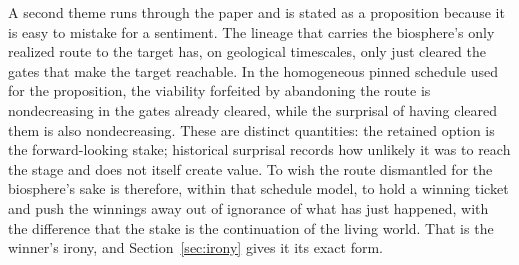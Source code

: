 A second theme runs through the paper and is stated as a proposition
because it is easy to mistake for a sentiment. The lineage that carries
the biosphere's only realized route to the target has, on geological
timescales, only just cleared the gates that make the target reachable.
In the homogeneous pinned schedule used for the proposition, the
viability forfeited by abandoning the route is nondecreasing in the
gates already cleared, while the surprisal of having cleared them is
also nondecreasing. These are distinct quantities: the retained option
is the forward-looking stake; historical surprisal records how unlikely
it was to reach the stage and does not itself create value. To wish the
route dismantled for the biosphere's sake is therefore, within that
schedule model, to hold a winning ticket and push the winnings away out
of ignorance of what has just happened, with the difference that the
stake is the continuation of the living world. That is the winner's
irony, and Section~\ref{sec:irony} gives it its exact form.


